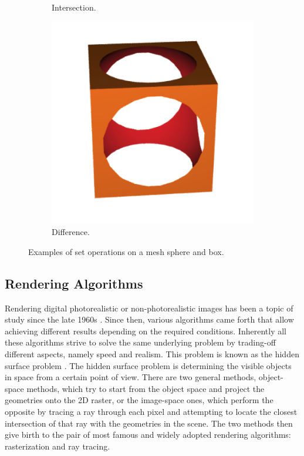 \documentclass[a4paper,11pt,oneside]{article}
\begin{document}
\begin{figure}[ht]
\begin{subfigure}[b]{0.3\textwidth}
         \caption{Intersection.}
          \label{sec1:intersection}
     \end{subfigure}
     \hfill
     \begin{subfigure}[b]{0.3\textwidth}
         \centering
         \includegraphics[width=\textwidth]{section1/difference.png}
         \caption{Difference.}
         \label{sec1:difference}
     \end{subfigure}
     \hfill
        \caption{Examples of set operations on a mesh sphere and box.}
        \label{sec1:set-operations-examples}
\end{figure}

  
\subsection{Rendering Algorithms}
  
Rendering digital photorealistic or non-photorealistic images has been a topic of study since the late 1960s \cite{INITIAL_RENDERING}. Since then, various algorithms came forth that allow achieving different results depending on the required conditions. Inherently all these algorithms strive to solve the same underlying problem by trading-off different aspects, namely speed and realism. This problem is known as the hidden surface problem \cite{hidden-surface-problem}. The hidden surface problem is determining the visible objects in space from a certain point of view. There are two general methods, object-space methods, which try to start from the object space and project the geometries onto the 2D raster, or the image-space ones, which perform the opposite by tracing a ray through each pixel and attempting to locate the closest intersection of that ray with the geometries in the scene. The two methods then give birth to the pair of most famous and widely adopted rendering algorithms: rasterization and ray tracing.
  
\end{document}
